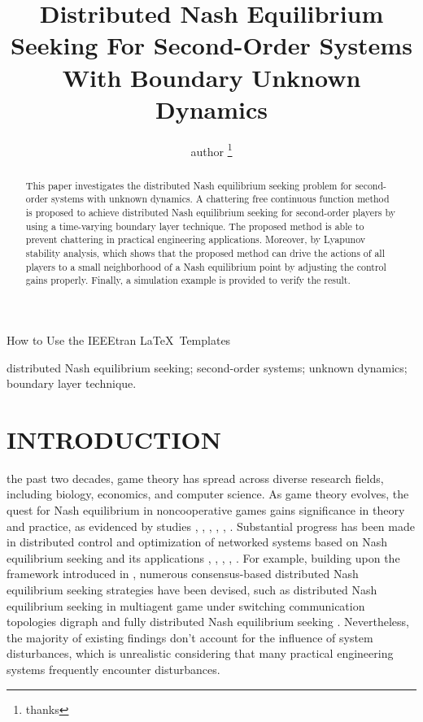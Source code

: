 \documentclass[lettersize,journal]{IEEEtran}
\begin{document}
\title{Distributed Nash Equilibrium Seeking For Second-Order Systems With Boundary Unknown Dynamics}
\author{author
    \thanks{thanks}}

%
{How to Use the IEEEtran \LaTeX \ Templates}

\maketitle

\begin{abstract}
    This paper investigates the distributed Nash equilibrium seeking problem for second-order systems with unknown dynamics. A chattering free continuous function method is proposed to achieve distributed Nash equilibrium seeking for second-order players by using a time-varying boundary layer technique. The proposed method is able to prevent chattering in practical engineering applications.
    Moreover, by Lyapunov stability analysis, which shows that the proposed method can drive the actions of all players to a small neighborhood of a Nash equilibrium point by adjusting the control gains properly. Finally, a simulation example is provided to verify the result.
\end{abstract}

\begin{IEEEkeywords}
    distributed Nash equilibrium seeking; second-order systems; unknown dynamics; boundary layer technique.
\end{IEEEkeywords}


\section{INTRODUCTION}
the past two decades, game theory has spread across diverse research fields, including biology, economics, and computer science. As game theory evolves, the quest for Nash equilibrium in noncooperative games gains significance in theory and practice, as evidenced by studies \cite{pozo2011finding}, \cite{ratliff2016characterization}, \cite{lou2015nash}, \cite{stankovic2011distributed}, \cite{liu2011stochastic}, \cite{durr2013lie}.
Substantial progress has been made in distributed control and optimization of networked systems based on Nash equilibrium seeking and its applications \cite{ding2019distributed}, \cite{wu2021resilient}, \cite{lewis2013cooperative}, \cite{ge2021dynamic}, \cite{ye2022distributed}.
For example, building upon the framework introduced in \cite{7888532}, numerous consensus-based distributed Nash equilibrium seeking strategies have been devised, such as distributed Nash equilibrium seeking in multiagent game under switching communication topologies digraph \cite{8093754} and fully distributed Nash equilibrium seeking \cite{ye2021adaptive}. Nevertheless, the majority of existing findings don't account for the influence of system disturbances, which is unrealistic considering that many practical engineering systems frequently encounter disturbances.
\end{document}
